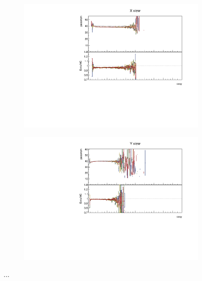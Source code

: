 \documentclass[12pt,a4paper]{article}
\begin{document}
\begin{figure}[h!]
\begin{subfigure}{0.5\textwidth}
  \end{subfigure}
  \begin{subfigure}{0.5\textwidth}
    \includegraphics[width=\linewidth]{PlotsAngularDistribution/pecorrcm_cosy_x.pdf}
  \end{subfigure}
  \begin{subfigure}{0.5\textwidth}
    \includegraphics[width=\linewidth]{PlotsAngularDistribution/pecorrcm_cosy_y.pdf}
  \end{subfigure}
  \caption{...}
  \label{figAbsCalibCosY1}
\end{figure}
\end{document}
